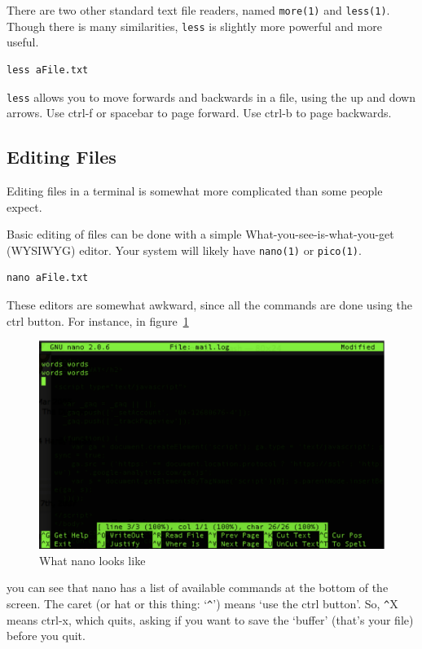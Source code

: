 There are two other standard text file readers, named {\tt more(1)}
and {\tt less(1)}. Though there is many similarities, {\tt less} is slightly
more powerful and more useful.

{\tt \begin{verbatim}
less aFile.txt
\end{verbatim}
}

{\tt less} allows you to move forwards and backwards in a file, using the up and down arrows.
Use ctrl-f or spacebar to page forward. Use ctrl-b to page backwards.

\subsection{Editing Files}
Editing files in a terminal is somewhat more complicated 
than some people expect.

Basic editing of files can be done with a simple What-you-see-is-what-you-get (WYSIWYG)
editor.  Your system will likely have {\tt nano(1)} or {\tt pico(1)}.
{\tt \begin{verbatim}
nano aFile.txt
\end{verbatim}
}

These editors are somewhat awkward, since all the commands are done
using the ctrl button.  For instance, in figure~\ref{nano}
\begin{figure}
		\includegraphics[scale=0.6]{shell/nano.pdf} 
		\caption{What nano looks like}
		\label{nano}
\end{figure}
you can see that nano has a list of available commands at the bottom of the screen.  
The caret (or hat or this thing: `\verb|^|') means `use the ctrl button'.
So, \verb|^|X means ctrl-x, which quits, asking if you want to save the `buffer' 
(that's your file) before you quit.

